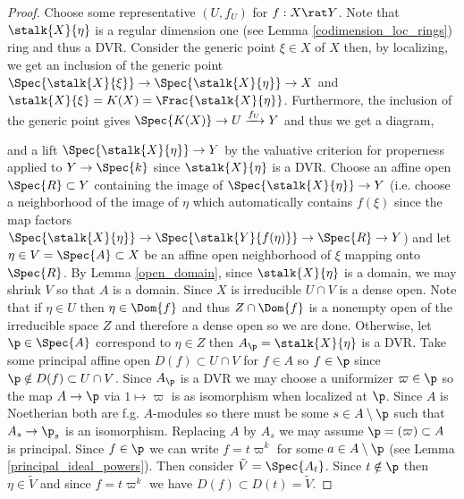 \documentclass[12pt]{article}
\begin{document}
\begin{proof}
Choose some representative $(U, f_U)$ for $f : X \rat Y$. Note that $\stalk{X}{\eta}$ is a regular dimension one (see Lemma \ref{codimension_loc_rings}) ring and thus a DVR. Consider the generic point $\xi \in X$ of $X$ then, by localizing, we get an inclusion of the generic point $\Spec{\stalk{X}{\xi}} \to \Spec{\stalk{X}{\eta}} \to X$ and $\stalk{X}{\xi} = K(X) = \Frac{\stalk{X}{\eta}}$. Furthermore, the inclusion of the generic point gives $\Spec{K(X)} \to U \xrightarrow{f_U} Y$ and thus we get a diagram,
\begin{center}
\end{center}
and a lift $\Spec{\stalk{X}{\eta}} \to Y$ by the valuative criterion for properness applied to $Y \to \Spec{k}$ since $\stalk{X}{\eta}$ is a DVR. Choose an affine open $\Spec{R} \subset Y$ containing the image of $\Spec{\stalk{X}{\eta}} \to Y$ (i.e. choose a neighborhood of the image of $\eta$ which automatically contains $f(\xi)$ since the map factors $\Spec{\stalk{X}{\eta}} \to \Spec{\stalk{Y}{f(\eta)}} \to \Spec{R} \to Y$) and let $\eta \in V = \Spec{A} \subset X$ be an affine open neighborhood of $\xi$ mapping onto $\Spec{R}$. By Lemma \ref{open_domain}, since $\stalk{X}{\eta}$ is a domain, we may shrink $V$ so that $A$ is a domain. Since $X$ is irreducible $U \cap V$ is a dense open. Note that if $\eta \in U$ then $\eta \in \Dom{f}$ and thus $Z \cap \Dom{f}$ is a nonempty open of the irreducible space $Z$ and therefore a dense open so we are done. Otherwise, let $\p \in \Spec{A}$ correspond to $\eta \in Z$ then $A_\p = \stalk{X}{\eta}$ is a  DVR. Take some principal affine open $D(f) \subset U \cap V$ for $f \in A$ so $f \in \p$ since $\p \notin D(f) \subset U \cap V$. Since $A_\p$ is a DVR we may choose a uniformizer $\varpi \in \p$ so the map $A \to \p$ via $1 \mapsto \varpi$ is as isomorphism when localized at $\p$. Since $A$ is Noetherian both are f.g. $A$-modules so there must be some $s \in A \setminus \p$ such that $A_s \to \p_s$ is an isomorphism. Replacing $A$ by $A_s$ we may assume $\p = (\varpi) \subset A$ is principal. Since $f \in \p$ we can write $f = t \varpi^k$ for some $a \in A \setminus \p$ (see Lemma \ref{principal_ideal_powers}). Then consider $\tilde{V} = \Spec{A_t}$. Since $t \notin \p$ then $\eta \in \tilde{V}$ and since $f = t \varpi^k$ we have $D(f) \subset D(t) = \tilde{V}$.

\end{proof}
\end{document}

